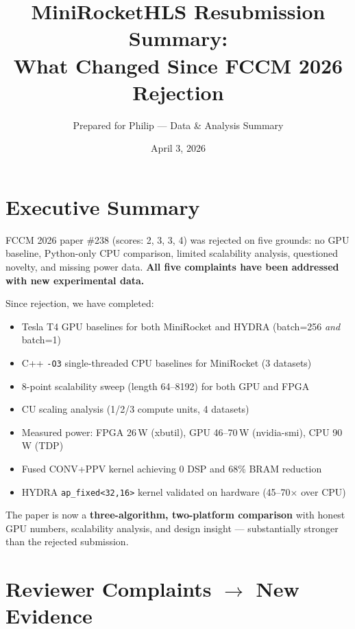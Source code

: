 \documentclass[11pt]{article}
\title{MiniRocketHLS Resubmission Summary:\\
\large What Changed Since FCCM 2026 Rejection}
\author{Prepared for Philip --- Data \& Analysis Summary}
\date{April 3, 2026}
\begin{document}
\maketitle

\section{Executive Summary}

FCCM 2026 paper \#238 (scores: 2, 3, 3, 4) was rejected on five grounds:
no GPU baseline, Python-only CPU comparison, limited scalability analysis,
questioned novelty, and missing power data.
\textbf{All five complaints have been addressed with new experimental data.}

Since rejection, we have completed:
\begin{itemize}[nosep]
  \item Tesla T4 GPU baselines for both MiniRocket and HYDRA (batch=256 \emph{and} batch=1)
  \item C++ \texttt{-O3} single-threaded CPU baselines for MiniRocket (3 datasets)
  \item 8-point scalability sweep (length 64--8192) for both GPU and FPGA
  \item CU scaling analysis (1/2/3 compute units, 4 datasets)
  \item Measured power: FPGA 26\,W (xbutil), GPU 46--70\,W (nvidia-smi), CPU 90\,W (TDP)
  \item Fused CONV+PPV kernel achieving 0 DSP and 68\% BRAM reduction
  \item HYDRA \texttt{ap\_fixed<32,16>} kernel validated on hardware (45--70$\times$ over CPU)
\end{itemize}

The paper is now a \textbf{three-algorithm, two-platform comparison} with honest
GPU numbers, scalability analysis, and design insight --- substantially stronger
than the rejected submission.

\section{Reviewer Complaints $\rightarrow$ New Evidence}
\end{document}
